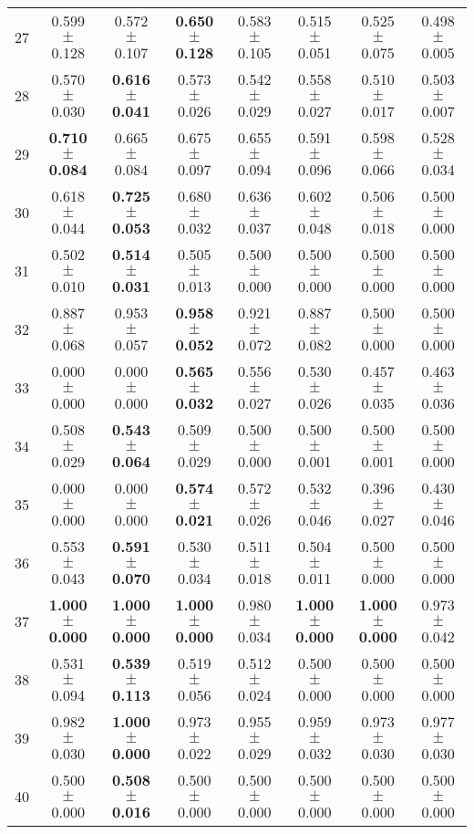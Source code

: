 \begin{table}[!ht]
{\begin{tabular}{r c c c c c c c}
27 & 0.599 $\pm$ 0.128 & 0.572 $\pm$ 0.107 & \textbf{0.650 $\pm$ 0.128} & 0.583 $\pm$ 0.105 & 0.515 $\pm$ 0.051 & 0.525 $\pm$ 0.075 & 0.498 $\pm$ 0.005 \\
28 & 0.570 $\pm$ 0.030 & \textbf{0.616 $\pm$ 0.041} & 0.573 $\pm$ 0.026 & 0.542 $\pm$ 0.029 & 0.558 $\pm$ 0.027 & 0.510 $\pm$ 0.017 & 0.503 $\pm$ 0.007 \\
29 & \textbf{0.710 $\pm$ 0.084} & 0.665 $\pm$ 0.084 & 0.675 $\pm$ 0.097 & 0.655 $\pm$ 0.094 & 0.591 $\pm$ 0.096 & 0.598 $\pm$ 0.066 & 0.528 $\pm$ 0.034 \\
30 & 0.618 $\pm$ 0.044 & \textbf{0.725 $\pm$ 0.053} & 0.680 $\pm$ 0.032 & 0.636 $\pm$ 0.037 & 0.602 $\pm$ 0.048 & 0.506 $\pm$ 0.018 & 0.500 $\pm$ 0.000 \\
31 & 0.502 $\pm$ 0.010 & \textbf{0.514 $\pm$ 0.031} & 0.505 $\pm$ 0.013 & 0.500 $\pm$ 0.000 & 0.500 $\pm$ 0.000 & 0.500 $\pm$ 0.000 & 0.500 $\pm$ 0.000 \\
32 & 0.887 $\pm$ 0.068 & 0.953 $\pm$ 0.057 & \textbf{0.958 $\pm$ 0.052} & 0.921 $\pm$ 0.072 & 0.887 $\pm$ 0.082 & 0.500 $\pm$ 0.000 & 0.500 $\pm$ 0.000 \\
33 & 0.000 $\pm$ 0.000 & 0.000 $\pm$ 0.000 & \textbf{0.565 $\pm$ 0.032} & 0.556 $\pm$ 0.027 & 0.530 $\pm$ 0.026 & 0.457 $\pm$ 0.035 & 0.463 $\pm$ 0.036 \\
34 & 0.508 $\pm$ 0.029 & \textbf{0.543 $\pm$ 0.064} & 0.509 $\pm$ 0.029 & 0.500 $\pm$ 0.000 & 0.500 $\pm$ 0.001 & 0.500 $\pm$ 0.001 & 0.500 $\pm$ 0.000 \\
35 & 0.000 $\pm$ 0.000 & 0.000 $\pm$ 0.000 & \textbf{0.574 $\pm$ 0.021} & 0.572 $\pm$ 0.026 & 0.532 $\pm$ 0.046 & 0.396 $\pm$ 0.027 & 0.430 $\pm$ 0.046 \\
36 & 0.553 $\pm$ 0.043 & \textbf{0.591 $\pm$ 0.070} & 0.530 $\pm$ 0.034 & 0.511 $\pm$ 0.018 & 0.504 $\pm$ 0.011 & 0.500 $\pm$ 0.000 & 0.500 $\pm$ 0.000 \\
37 & \textbf{1.000 $\pm$ 0.000} & \textbf{1.000 $\pm$ 0.000} & \textbf{1.000 $\pm$ 0.000} & 0.980 $\pm$ 0.034 & \textbf{1.000 $\pm$ 0.000} & \textbf{1.000 $\pm$ 0.000} & 0.973 $\pm$ 0.042 \\
38 & 0.531 $\pm$ 0.094 & \textbf{0.539 $\pm$ 0.113} & 0.519 $\pm$ 0.056 & 0.512 $\pm$ 0.024 & 0.500 $\pm$ 0.000 & 0.500 $\pm$ 0.000 & 0.500 $\pm$ 0.000 \\
39 & 0.982 $\pm$ 0.030 & \textbf{1.000 $\pm$ 0.000} & 0.973 $\pm$ 0.022 & 0.955 $\pm$ 0.029 & 0.959 $\pm$ 0.032 & 0.973 $\pm$ 0.030 & 0.977 $\pm$ 0.030 \\
40 & 0.500 $\pm$ 0.000 & \textbf{0.508 $\pm$ 0.016} & 0.500 $\pm$ 0.000 & 0.500 $\pm$ 0.000 & 0.500 $\pm$ 0.000 & 0.500 $\pm$ 0.000 & 0.500 $\pm$ 0.000 \\
\end{tabular}}
\end{table}
